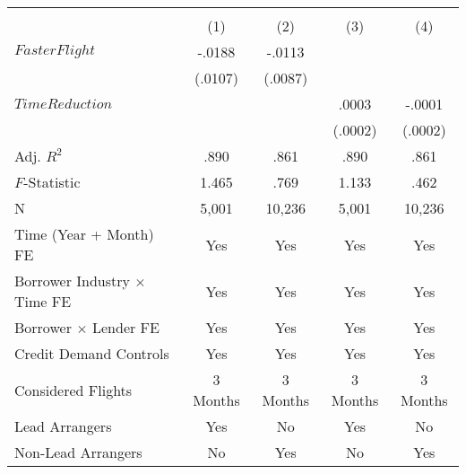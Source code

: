  \renewcommand{\arraystretch}{1.2} \begin{tabular}{lcccc}  \midrule \midrule  &  &  \\  \cmidrule(lr){2-3} \cmidrule(lr){4-5}  & (1) & (2) & (3) & (4) \\  
 \midrule
$FasterFlight$      &      -.0188\sym{*}  &      -.0113         &                     &                     \\
                    &     (.0107)         &     (.0087)         &                     &                     \\
\addlinespace
$TimeReduction$     &                     &                     &       .0003         &      -.0001         \\
                    &                     &                     &     (.0002)         &     (.0002)         \\
\midrule
Adj. $R^2$          &        .890         &        .861         &        .890         &        .861         \\
$F$-Statistic       &       1.465         &        .769         &       1.133         &        .462         \\
N                   &       5,001         &      10,236         &       5,001         &      10,236         \\
\midrule Time (Year + Month) FE & Yes & Yes & Yes & Yes \\ Borrower Industry $\times$ Time FE & Yes & Yes & Yes & Yes \\ Borrower $\times$ Lender FE & Yes & Yes & Yes & Yes  \\ Credit Demand Controls & Yes & Yes & Yes & Yes \\ Considered Flights & \small{3 Months} & \small{3 Months} & \small{3 Months} & \small{3 Months} \\ \midrule Lead Arrangers & Yes & No & Yes & No \\ Non-Lead Arrangers & No & Yes & No & Yes \\ \midrule \midrule \end{tabular} \renewcommand{\arraystretch}{1} 
